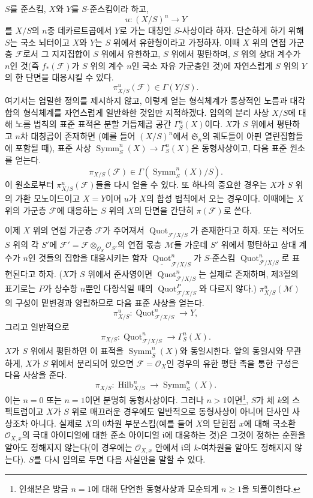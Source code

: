 
$S$를 준스킴, $X$와 $Y$를 $S$-준스킴이라 하고,
\[
u:(X/S)^n\longrightarrow Y
\]
를 $X/S$의 $n$중 데카르트곱에서 $Y$로 가는 대칭인 $S$-사상이라 하자.
단순하게 하기 위해 $S$는 국소 뇌터이고 $X$와 $Y$는 $S$ 위에서
유한형이라고 가정하자. 이때 $X$ 위의 연접 가군층 $\mathcal F$로서 그
지지집합이 $S$ 위에서 유한하고, $S$ 위에서 평탄하며, $S$ 위의 상대 계수가
$n$인 것(즉 $f_*(\mathcal F)$가 $S$ 위의 계수 $n$인 국소 자유 가군층인
것)에 자연스럽게 $S$ 위의 $Y$의 한 단면을 대응시킬 수 있다.
\[
\pi^u_{X/S}(\mathcal F)\in\Gamma(Y/S).
\]
여기서는 엄밀한 정의를 제시하지 않고, 이렇게 얻는 형식체계가 통상적인
노름과 대각합의 형식체계를 자연스럽게 일반화한 것임만 지적하겠다. 임의의
분리 사상 $X/S$에 대해 노름 법칙의 표준 표적은 분할 거듭제곱 공간
$\Gamma^n_S(X)$이다. $X$가 $S$ 위에서 평탄하고 $n$차 대칭곱이 존재하면
(예를 들어 $(X/S)^n$에서 $\mathfrak S_n$의 궤도들이 아핀 열린집합들에
포함될 때), 표준 사상
$\operatorname{Symm}^n_S(X)\to\Gamma^n_S(X)$은 동형사상이고, 다음 표준
원소를 얻는다.
\[
\pi_{X/S}(\mathcal F)\in\Gamma(\operatorname{Symm}^n_S(X)/S).
\]
이 원소로부터 $\pi^u_{X/S}(\mathcal F)$들을 다시 얻을 수 있다. 또 하나의
중요한 경우는 $X$가 $S$ 위의 가환 모노이드이고 $X=Y$이며 $u$가 $X$의
합성 법칙에서 오는 경우이다. 이때에는 $X$ 위의 가군층 $\mathcal F$에
대응하는 $S$ 위의 $X$의 단면을 간단히 $\pi(\mathcal F)$로 쓴다.

이제 $X$ 위의 연접 가군층 $\mathcal F$가 주어져서
$\operatorname{Quot}_{\mathcal F/X/S}$가 존재한다고 하자. 또는 적어도
$S$ 위의 각 $S'$에 $\mathcal F'=\mathcal F\otimes_{\mathcal O_S}
\mathcal O_{S'}$의 연접 몫층 $\mathcal M$들 가운데 $S'$ 위에서 평탄하고
상대 계수가 $n$인 것들의 집합을 대응시키는 함자
$\underline{\operatorname{Quot}}^n_{\mathcal F/X/S}$가 $S$-준스킴
$\operatorname{Quot}^n_{\mathcal F/X/S}$로 표현된다고 하자. ($X$가 $S$
위에서 준사영이면 $\operatorname{Quot}^n_{\mathcal F/X/S}$는 실제로
존재하며, 제3절의 표기로는 $P$가 상수항 $n$뿐인 다항식일 때의
$\operatorname{Quot}^P_{\mathcal F/X/S}$와 다르지 않다.)
$\pi^u_{X/S}(\mathcal M)$의 구성이 밑변경과 양립하므로 다음 표준 사상을
얻는다.
\[
\pi^u_{X/S}:\operatorname{Quot}^n_{\mathcal F/X/S}\longrightarrow Y,
\]
그리고 일반적으로
\[ \pi_{X/S}:\operatorname{Quot}^n_{\mathcal F/X/S}
\longrightarrow\Gamma^n_S(X). \]
$X$가 $S$ 위에서 평탄하면 이 표적을 $\operatorname{Symm}^n_S(X)$와
동일시한다. 앞의 동일시와 무관하게, $X$가 $S$ 위에서 분리되어 있으면
$\mathcal F=\mathcal O_X$인 경우의 유한 평탄 족을 통한 구성은 다음 사상을
준다.
\[
\pi_{X/S}:\operatorname{Hilb}^n_{X/S}
\longrightarrow\operatorname{Symm}^n_S(X).
\]
이는 $n=0$ 또는 $n=1$이면 분명히 동형사상이다. 그러나
$n>1$이면\footnote{인쇄본은 방금 $n=1$에 대해 단언한 동형사상과
모순되게 $n\geq1$을 되풀이한다.}, $S$가 체 $k$의 스펙트럼이고 $X$가
$S$ 위로 매끄러운 경우에도 일반적으로 동형사상이 아니며 단사인 사상조차
아니다. 실제로 $X$의 0차원 부분스킴(예를 들어 $X$의 닫힌점 $x$에 대해
국소환 $\mathcal O_{X,x}$의 극대 아이디얼에 대한 준소 아이디얼
$\mathfrak i$에 대응하는 것)은 그것이 정하는 순환을 알아도 정해지지
않는다(이 경우에는 $\mathcal O_{X,x}$ 안에서 $\mathfrak i$의 $k$-여차원을
알아도 정해지지 않는다). $S$를 다시 임의로 두면 다음 사실만을 말할 수
있다.

